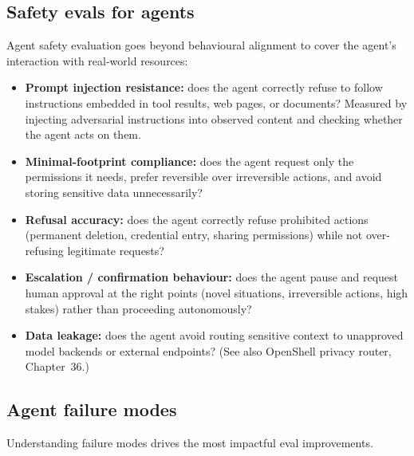 \subsection{Safety evals for agents}

Agent safety evaluation goes beyond behavioural alignment to cover the agent's
interaction with real-world resources:

\begin{itemize}
  \item \textbf{Prompt injection resistance:} does the agent correctly refuse to
    follow instructions embedded in tool results, web pages, or documents? Measured
    by injecting adversarial instructions into observed content and checking whether
    the agent acts on them.
  \item \textbf{Minimal-footprint compliance:} does the agent request only the
    permissions it needs, prefer reversible over irreversible actions, and avoid
    storing sensitive data unnecessarily?
  \item \textbf{Refusal accuracy:} does the agent correctly refuse prohibited actions
    (permanent deletion, credential entry, sharing permissions) while not over-refusing
    legitimate requests?
  \item \textbf{Escalation / confirmation behaviour:} does the agent pause and request
    human approval at the right points (novel situations, irreversible actions, high
    stakes) rather than proceeding autonomously?
  \item \textbf{Data leakage:} does the agent avoid routing sensitive context to
    unapproved model backends or external endpoints? (See also OpenShell privacy router,
    Chapter~36.)
\end{itemize}

\subsection{Agent failure modes}

Understanding failure modes drives the most impactful eval improvements.

